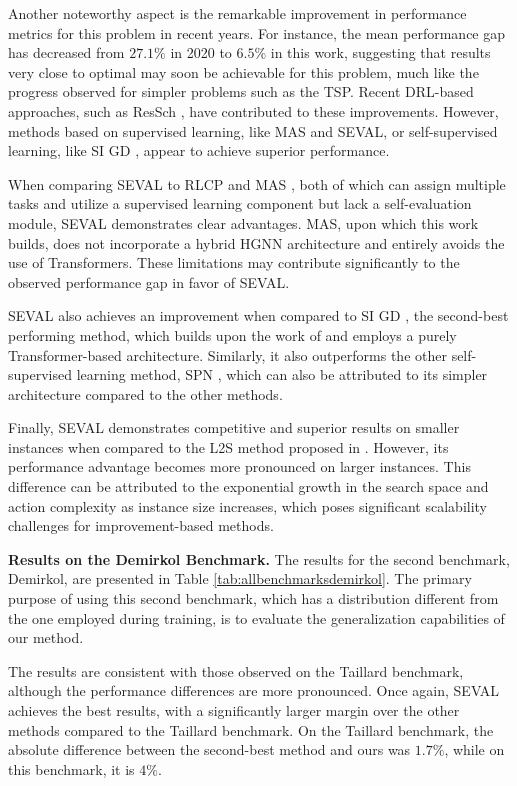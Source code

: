 Another noteworthy aspect is the remarkable improvement in performance metrics for this problem in recent years. For instance, the mean performance gap has decreased from $27.1\%$ in 2020 \cite{zhang2020learning} to $6.5\%$ in this work, suggesting that results very close to optimal may soon be achievable for this problem, much like the progress observed for simpler problems such as the TSP. Recent DRL-based approaches, such as ResSch \cite{ho2024residual}, have contributed to these improvements. However, methods based on supervised learning, like MAS \cite{echeverria2024multi} and SEVAL, or self-supervised learning, like SI GD \cite{pirnay2024self}, appear to achieve superior performance.

When comparing SEVAL to RLCP \cite{tassel2023end} and MAS \cite{echeverria2024multi}, both of which can assign multiple tasks and utilize a supervised learning component but lack a self-evaluation module, SEVAL demonstrates clear advantages. MAS, upon which this work builds, does not incorporate a hybrid HGNN architecture and entirely avoids the use of Transformers. These limitations may contribute significantly to the observed performance gap in favor of SEVAL.

SEVAL also achieves an improvement when compared to SI GD \cite{pirnay2024self}, the second-best performing method, which builds upon the work of \cite{drakulic2024bq} and employs a purely Transformer-based architecture. Similarly, it also outperforms the other self-supervised learning method, SPN \cite{corsini2024self}, which can also be attributed to its simpler architecture compared to the other methods.

Finally, SEVAL demonstrates competitive and superior results on smaller instances when compared to the L2S method proposed in \cite{zhang2024deep}. However, its performance advantage becomes more pronounced on larger instances. This difference can be attributed to the exponential growth in the search space and action complexity as instance size increases, which poses significant scalability challenges for improvement-based methods.

\textbf{Results on the Demirkol Benchmark.}  The results for the second benchmark, Demirkol, are presented in Table \ref{tab:allbenchmarksdemirkol}. The primary purpose of using this second benchmark, which has a distribution different from the one employed during training, is to evaluate the generalization capabilities of our method. 

The results are consistent with those observed on the Taillard benchmark, although the performance differences are more pronounced. Once again, SEVAL achieves the best results, with a significantly larger margin over the other methods compared to the Taillard benchmark. On the Taillard benchmark, the absolute difference between the second-best method and ours was \(1.7\%\), while on this benchmark, it is \(4\%\).

